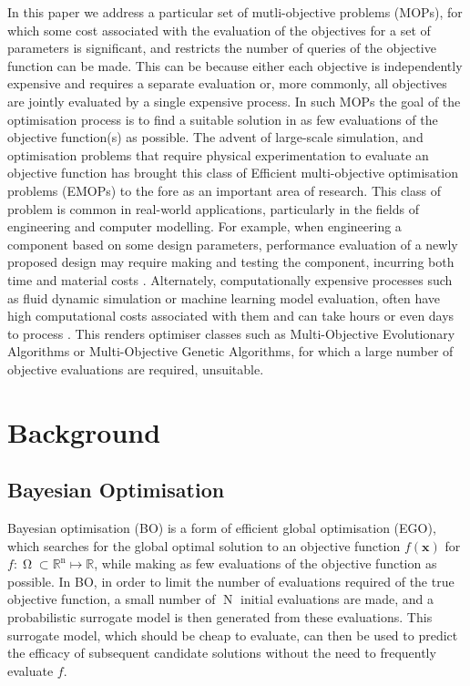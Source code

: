 \documentclass[conference]{IEEEtran}
\DeclareMathOperator*{\ninitialevaluations}{N}
\DeclareMathOperator*{\parameterspace}{\Omega}
\DeclareMathOperator*{\ndim}{n}
\begin{document}
In this paper we address a particular set of mutli-objective problems (MOPs), for which some cost associated with the evaluation of the objectives for a set of parameters is significant, and restricts the number of queries of the objective function can be made. This can be because either each objective is independently expensive and requires a separate evaluation or, more commonly, all objectives are jointly evaluated by a single expensive process. In such MOPs the goal of the optimisation process is to find a suitable solution in as few evaluations of the objective function(s) as possible. The advent of large-scale simulation, and optimisation problems that require physical experimentation to evaluate an objective function has brought this class of Efficient multi-objective optimisation problems (EMOPs) to the fore as an important area of research. This class of problem is common in real-world applications, particularly in the fields of engineering and computer modelling. For example, when engineering a component based on some design parameters, performance evaluation of a newly proposed design may require making and testing the component, incurring both time and material costs \cite{fang2017design}. Alternately, computationally expensive processes such as fluid dynamic simulation or machine learning model evaluation, often have high computational costs associated with them and can take hours or even days to process \cite{huband2005scalable}. This renders optimiser classes such as Multi-Objective Evolutionary Algorithms\cite{tanabe2017benchmarking,coello2007evolutionary} or Multi-Objective Genetic Algorithms\cite{tamaki1996multi}, for which a large number of objective evaluations are required, unsuitable. 

\section{Background}
\subsection{Bayesian Optimisation}\label{section:background_BayesianOptimisation}
Bayesian optimisation (BO) is a form of efficient global optimisation (EGO), which searches for the global optimal solution to an objective function $f(\mathbf{x})$ for  $f: \parameterspace \subset \mathbb{R}^{\ndim} \mapsto \mathbb{R}$, while making as few evaluations of the objective function as possible. In BO, in order to limit the number of evaluations required of the true objective function,  a small number of $\ninitialevaluations$ initial evaluations are made, and a probabilistic surrogate model is then generated from these evaluations. This surrogate model, which should be cheap to evaluate, can then be used to predict the efficacy of subsequent candidate solutions without the need to frequently evaluate $f$. 
\end{document}
